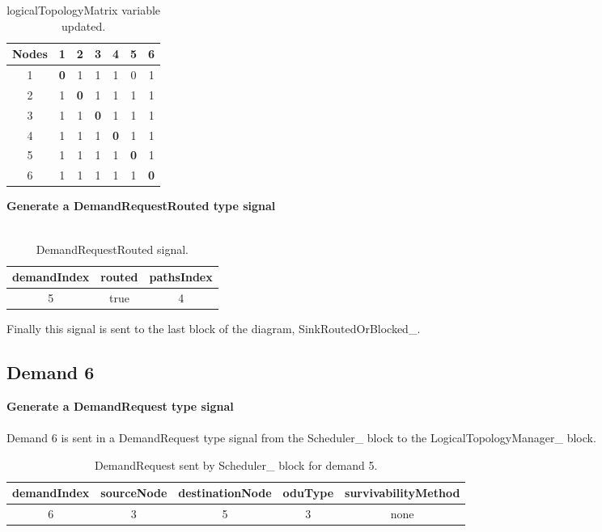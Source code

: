 \begin{table}[H]
	\centering	
	\begin{tabular}{|c|c|c|c|c|c|c|}
		\hline
		\multicolumn{1}{|l|}{\textbf{Nodes}} & 1   & 2   & 3   & 4   & 5   & 6  \\ \hline
		1                           & \textbf{0}   & 1 & 1 & 1 & 0 & 1 \\ \hline
		2                           & 1 & \textbf{0}   & 1 & 1 & 1 & 1 \\ \hline
		3                           & 1 & 1 & \textbf{0}   & 1 & 1 & 1 \\ \hline
		4                           & 1 & 1 & 1 & \textbf{0}   & 1 & 1 \\ \hline
		5                           & 1 & 1 & 1 & 1 & \textbf{0}   & 1 \\ \hline
		6                           & 1 & 1 & 1 & 1 & 1 & \textbf{0}   \\ \hline
	\end{tabular}
	\caption{logicalTopologyMatrix variable updated.}
	\label{Transparentlogical_topology_updated}
\end{table}

\textbf{Generate a DemandRequestRouted type signal}\\ \\

\begin{table}[H]
	\centering
	\begin{tabular}{|c|c|c|}
		\hline
		demandIndex & routed & pathsIndex \\ \hline
		5 & true & 4 \\ \hline
	\end{tabular}
	\caption{DemandRequestRouted signal.}
\end{table}

Finally this signal is sent to the last block of the diagram, SinkRoutedOrBlocked\_.
\subsection{Demand 6}
\textbf{Generate a DemandRequest type signal}\\ \\
Demand 6 is sent in a DemandRequest type signal from the Scheduler\_  block to the LogicalTopologyManager\_  block.
\begin{table}[H]
	\centering
	\begin{tabular}{|c|c|c|c|c|}
		\hline
		demandIndex & sourceNode & destinationNode & oduType & survivabilityMethod \\ \hline
		6           & 3          & 5               & 3       & none                   \\ \hline
	\end{tabular}
	\caption{DemandRequest sent by Scheduler\_  block for demand 5.}
\end{table}

